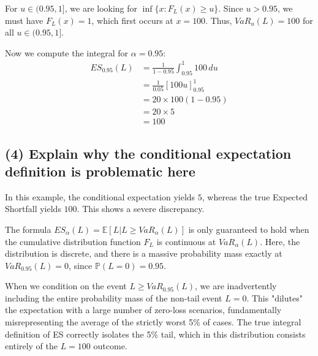 For $u \in (0.95, 1]$, we are looking for $\inf\{x : F_L(x) \ge u\}$. Since $u > 0.95$, we must have $F_L(x) = 1$, which first occurs at $x = 100$. Thus, $VaR_u(L) = 100$ for all $u \in (0.95, 1]$.

Now we compute the integral for $\alpha = 0.95$:
\begin{align*}
ES_{0.95}(L) &= \frac{1}{1 - 0.95} \int_{0.95}^1 100 \, du \\
&= \frac{1}{0.05} \left[ 100u \right]_{0.95}^1 \\
&= 20 \times 100(1 - 0.95) \\
&= 20 \times 5 \\
&= 100
\end{align*}


\subsection*{(4) Explain why the conditional expectation definition is problematic here}

In this example, the conditional expectation yields $5$, whereas the true Expected Shortfall yields $100$. This shows a severe discrepancy.

The formula $ES_{\alpha}(L) = \mathbb{E}[L | L \ge VaR_{\alpha}(L)]$ is only guaranteed to hold when the cumulative distribution function $F_L$ is continuous at $VaR_{\alpha}(L)$. Here, the distribution is discrete, and there is a massive probability mass exactly at $VaR_{0.95}(L) = 0$, since $\mathbb{P}(L=0) = 0.95$.

When we condition on the event $L \ge VaR_{0.95}(L)$, we are inadvertently including the entire probability mass of the non-tail event $L=0$. This "dilutes" the expectation with a large number of zero-loss scenarios, fundamentally misrepresenting the average of the strictly worst 5\% of cases. The true integral definition of ES correctly isolates the 5\% tail, which in this distribution consists entirely of the $L=100$ outcome.